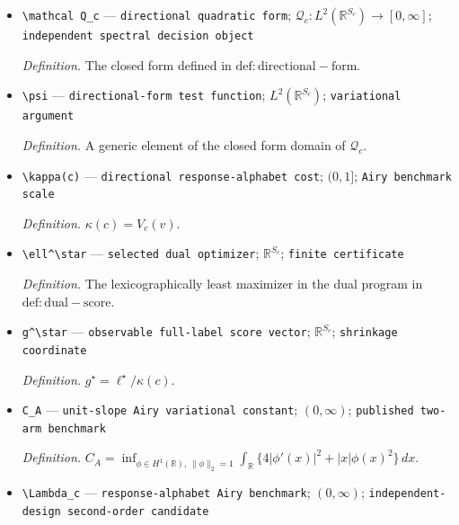 \documentclass{article}
\begin{document}
\begin{itemize}
  \par\smallskip\noindent\emph{Definition.} The finite linear-program value defined in \(\mathrm{def:response-cost}\).
  \item \texttt{\textbackslash{}\allowbreak{}mathcal Q\_\allowbreak{}c} --- \texttt{directional quadratic form}; \(\mathcal Q_c:L^2(\mathbb R^{S_c})\to[0,\infty]\); \texttt{independent spectral decision object}
  \par\smallskip\noindent\emph{Definition.} The closed form defined in \(\mathrm{def:directional-form}\).
  \item \texttt{\textbackslash{}\allowbreak{}psi} --- \texttt{directional-\allowbreak{}form test function}; \(L^2(\mathbb R^{S_c})\); \texttt{variational argument}
  \par\smallskip\noindent\emph{Definition.} A generic element of the closed form domain of \(\mathcal Q_c\).
  \item \texttt{\textbackslash{}\allowbreak{}kappa(c)} --- \texttt{directional response-\allowbreak{}alphabet cost}; \((0,1]\); \texttt{Airy benchmark scale}
  \par\smallskip\noindent\emph{Definition.} \(\kappa(c)=V_c(v)\).
  \item \texttt{\textbackslash{}\allowbreak{}ell\textasciicircum{}\textbackslash{}\allowbreak{}star} --- \texttt{selected dual optimizer}; \(\mathbb R^{S_c}\); \texttt{finite certificate}
  \par\smallskip\noindent\emph{Definition.} The lexicographically least maximizer in the dual program in \(\mathrm{def:dual-score}\).
  \item \texttt{g\textasciicircum{}\textbackslash{}\allowbreak{}star} --- \texttt{observable full-\allowbreak{}label score vector}; \(\mathbb R^{S_c}\); \texttt{shrinkage coordinate}
  \par\smallskip\noindent\emph{Definition.} \(g^\star=\ell^\star/\kappa(c)\).
  \item \texttt{C\_\allowbreak{}A} --- \texttt{unit-\allowbreak{}slope Airy variational constant}; \((0,\infty)\); \texttt{published two-\allowbreak{}arm benchmark}
  \par\smallskip\noindent\emph{Definition.} \(C_A=\inf_{\phi\in H^1(\mathbb R),\,\|\phi\|_2=1}\int_{\mathbb R}\{4|\phi'(x)|^2+|x|\phi(x)^2\}\,dx\).
  \item \texttt{\textbackslash{}\allowbreak{}Lambda\_\allowbreak{}c} --- \texttt{response-\allowbreak{}alphabet Airy benchmark}; \((0,\infty)\); \texttt{independent-\allowbreak{}design second-\allowbreak{}order candidate}

\end{itemize}
\end{document}
